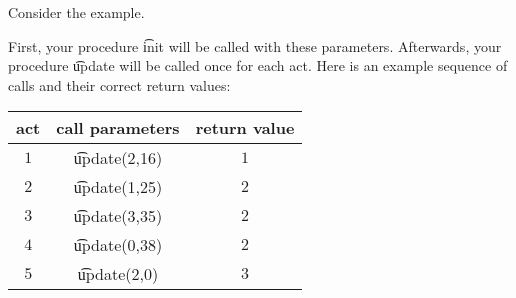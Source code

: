 Consider the example. 

First, your procedure \t{init} will be called with these parameters. Afterwards, your procedure
\t{update} will be called once for each act. Here is an example sequence of calls and their correct return values:
\begin{center}
\begin{tabular}{ c c c } 
act & call parameters & return value \\
\hline
$1$ & \t{update(2,16)} & $1$ \\
$2$ & \t{update(1,25)} & $2$ \\
$3$ & \t{update(3,35)} & $2$ \\
$4$ & \t{update(0,38)} & $2$ \\
$5$ & \t{update(2,0)} & $3$ \\
\end{tabular}
\end{center}

